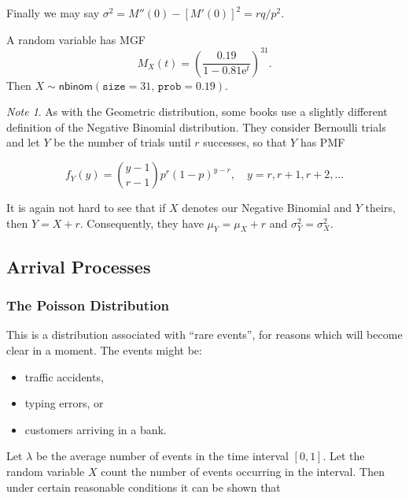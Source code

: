\documentclass[]{book}
\providecommand{\tightlist}{%
  \setlength{\itemsep}{0pt}\setlength{\parskip}{0pt}}
\numberwithin{equation}{chapter}
\numberwithin{figure}{chapter}
\theoremstyle{plain}
\theoremstyle{definition}
\theoremstyle{remark}
\newtheorem{note}[thm]{Note}
\theoremstyle{definition}
\theoremstyle{definition}
\theoremstyle{remark}
\let\BeginKnitrBlock\begin \let\EndKnitrBlock\end
\begin{document}
Finally we may say \(\sigma^{2} = M''(0) - [M'(0)]^{2} = rq/p^{2}.\)

\bigskip

\BeginKnitrBlock{example}
\protect\hypertarget{ex:unnamed-chunk-238}{}{\label{ex:unnamed-chunk-238}}A
random variable has MGF \[
M_{X}(t)=\left(\frac{0.19}{1-0.81\mathrm{e}^{t}}\right)^{31}.
\] Then \(X\sim\mathsf{nbinom}(\mathtt{size}=31,\,\mathtt{prob}=0.19)\).
\EndKnitrBlock{example}

\bigskip

\begin{note}
As with the Geometric distribution, some books use a slightly different
definition of the Negative Binomial distribution. They consider
Bernoulli trials and let \(Y\) be the number of trials until \(r\)
successes, so that \(Y\) has PMF

\begin{equation}
f_{Y}(y)={y-1 \choose r-1}p^{r}(1-p)^{y-r},\quad y=r,r+1,r+2,\ldots
\end{equation}

It is again not hard to see that if \(X\) denotes our Negative Binomial
and \(Y\) theirs, then \(Y=X+r\). Consequently, they have
\(\mu_{Y}=\mu_{X}+r\) and \(\sigma_{Y}^{2}=\sigma_{X}^{2}\).
\end{note}

\subsection{Arrival Processes}\label{sec-arrival-processes}

\subsubsection{The Poisson
Distribution}\label{sub-the-poisson-distribution}

This is a distribution associated with ``rare events'', for reasons
which will become clear in a moment. The events might be:

\begin{itemize}
\tightlist
\item
  traffic accidents,
\item
  typing errors, or
\item
  customers arriving in a bank.
\end{itemize}

Let \(\lambda\) be the average number of events in the time interval
\([0,1]\). Let the random variable \(X\) count the number of events
occurring in the interval. Then under certain reasonable conditions it
can be shown that
\end{document}
